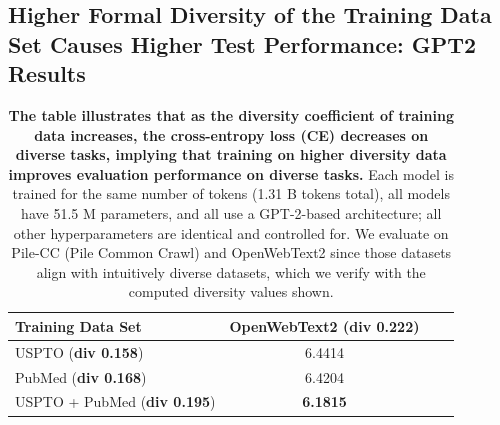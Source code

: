 \subsection{Higher Formal Diversity of the Training Data Set Causes Higher Test Performance: GPT2 Results}

\begin{table}[h!]
    \centering
    \caption{\textbf{The table illustrates that as the diversity coefficient of training data increases, the cross-entropy loss (CE) decreases on diverse tasks, implying that training on higher diversity data improves evaluation performance on diverse tasks.} 
    Each model is trained for the same number of tokens (1.31 B tokens total), 
    all models have 51.5 M parameters, and all use a GPT-2-based architecture; all other hyperparameters are identical and controlled for.
    We evaluate on Pile-CC (Pile Common Crawl) and OpenWebText2 since those datasets align with intuitively diverse datasets, which we verify with the computed diversity values shown.
    }
    \vspace{10pt}
    \begin{tabular}{lccc}
        \toprule
        Training Data Set & OpenWebText2 (\textbf{div 0.222}) \\
        \midrule
        USPTO (\textbf{div 0.158}) & 6.4414 \\
        PubMed (\textbf{div 0.168})  & 6.4204 \\
        USPTO + PubMed (\textbf{div 0.195}) & \textbf{6.1815} \\
        \bottomrule
    \end{tabular}
    \label{tab:div_vs_ppl}
\end{table}


